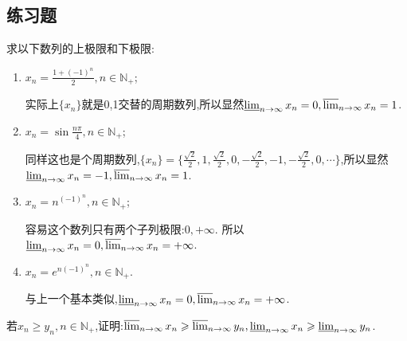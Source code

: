  \subsection{练习题}
     \begin{exercise}
         求以下数列的上极限和下极限:
         \begin{enumerate}
             \item $x_n=\frac{1+(-1)^n}{2},n\in\mathbb{N}_+$;
                   \begin{solution}
                       实际上$\{x_n\}$就是0,1交替的周期数列,所以显然$\varliminf_{n\to\infty} x_n=0,\varlimsup_{n\to\infty} x_n=1$.
                   \end{solution}
             \item $x_n=\sin\frac{n\pi}{4},n\in\mathbb{N}_+$;
                   \begin{solution}
                       同样这也是个周期数列,$\{x_n\}=\{\frac{\sqrt{2}}{2},1,\frac{\sqrt{2}}{2},0,-\frac{\sqrt{2}}{2},-1,-\frac{\sqrt{2}}{2},0,\cdots\}$,所以显然$\varliminf_{n\to\infty} x_n=-1,\varlimsup_{n\to\infty} x_n=1$.
                   \end{solution}
             \item $x_n=n^{(-1)^n},n\in\mathbb{N}_+$;
                   \begin{solution}
                       容易这个数列只有两个子列极限:$0,+\infty$.
                       所以$\varliminf_{n\to\infty} x_n=0,\varlimsup_{n\to\infty} x_n=+\infty$.
                   \end{solution}
             \item $x_n=e^{n(-1)^n},n\in\mathbb{N}_+$.
                   \begin{solution}
                       与上一个基本类似,$\varliminf_{n\to\infty} x_n=0,\varlimsup_{n\to\infty} x_n=+\infty$.
                   \end{solution}
         \end{enumerate}
     \end{exercise}

     \begin{exercise}
         若$x_n \geqslant y_n, n \in \mathbb{N}_+$,证明:$\varlimsup_{n\to\infty} x_n \geqslant \varlimsup_{n\to\infty} y_n, \varliminf_{n\to\infty} x_n \geqslant \varliminf_{n\to\infty} y_n$.
     \end{exercise}
     \begin{solution}

     \end{solution}
